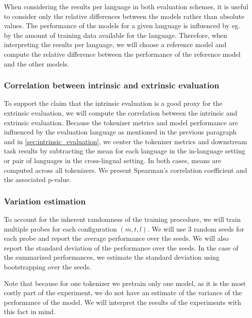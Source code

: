 When considering the results per language in both evaluation schemes, it is useful to consider only the relative differences between the models rather than absolute values. The performance of the models for a given language is influenced by eg. by the amount of training data available for the language. Therefore, when interpreting the results per language, we will choose a reference model and compute the relative difference between the performance of the reference model and the other models.

\subsubsection{Correlation between intrinsic and extrinsic evaluation}

To support the claim that the intrinsic evaluation is a good proxy for the extrinsic evaluation, we will compute the correlation between the intrinsic and extrinsic evaluation. Because the tokenizer metrics and model performance are influenced by the evaluation language as mentioned in the previous paragraph and in \autoref{sec:intrinsic_evaluation}, we center the tokenizer metrics and downstream task results by subtracting the mean for each language in the in-language setting or pair of languages in the cross-lingual setting. In both cases, means are computed across all tokenizers. We present Spearman’s correlation coefficient and the associated p-value.

\subsubsection{Variation estimation}

To account for the inherent randomness of the training procedure, we will train multiple probes for each configuration $(m, t, l)$. We will use 3 random seeds for each probe and report the average performance over the seeds. We will also report the standard deviation of the performance over the seeds. In the case of the summarized performances, we estimate the standard deviation using bootstrapping over the seeds.

Note that because for one tokenizer we pretrain only one model, as it is the most costly part of the experiment, we do not have an estimate of the variance of the performance of the model. We will interpret the results of the experiments with this fact in mind.



